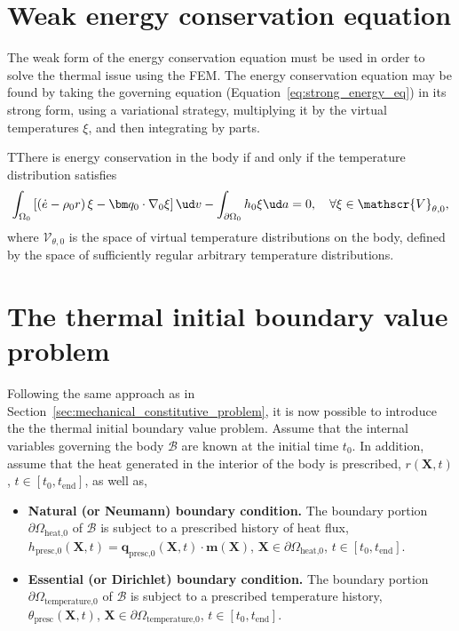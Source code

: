 \section{Weak energy conservation equation}

The weak form of the energy conservation equation must be used in order to solve the thermal issue using the FEM.
The energy conservation equation may be found by taking the governing equation (Equation~\eqref{eq:strong_energy_eq}) in its strong form, using a variational strategy, multiplying it by the virtual temperatures \(\xi\), and then integrating by parts.
\begin{problem}
TThere is energy conservation in the body if and only if the temperature distribution satisfies
    \begin{equation}
        \int_{\Omega_0}   \left[\left(\dot e - \rho_0 r\right) \xi - \bm q_0\cdot \nabla_0 \xi\right]\ud v - \int_{\partial\Omega_0} h_0 \xi\ud a = 0,\quad \forall \xi \in \mathscr{V}_{\theta,0},
    \end{equation}
 where $\mathscr{V}_{\theta,0}$ is the space of virtual temperature distributions on the body, defined by the space of sufficiently regular arbitrary temperature distributions.
 \end{problem}

\section{The thermal initial boundary value problem}

Following the same approach as in Section~\ref{sec:mechanical_constitutive_problem}, it is now possible to introduce the the thermal initial boundary value problem.
Assume that the internal variables governing the body \(\mathcal B\) are known at the initial time \(t_0\).
In addition, assume that the heat generated in the interior of the body is prescribed, \(r(\bm X, t)\), \(t\in[t_0, t_\text{end}]\), as well as,
\begin{itemize}
  \item \textbf{Natural (or Neumann) boundary condition.} The boundary portion \(\partial \Omega_\text{heat,0}\) of \(\mathcal B\) is subject to a prescribed history of heat flux, \(h_\text{presc,0}(\bm X, t) = \bm q_\text{presc,0}(\bm X, t)\cdot \bm m(\bm X)\), \(\bm X \in \partial \Omega_\text{heat,0}\), \(t\in [t_0,t_\text{end}]\).
  \item \textbf{Essential (or Dirichlet) boundary condition.} The boundary portion \(\partial \Omega_\text{temperature,0}\) of \(\mathcal B\) is subject to a prescribed temperature history, \(\theta_\text{presc}(\bm X, t)\), \(\bm X \in \partial \Omega_\text{temperature,0}\), \(t\in [t_0,t_\text{end}]\).
\end{itemize}

